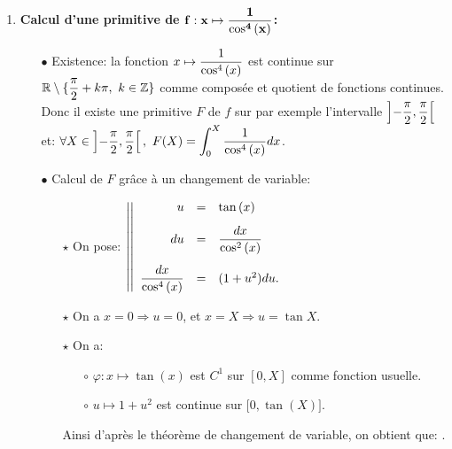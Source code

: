 \documentclass[a4paper, 11pt,reqno]{article}
\begin{document}
\begin{correction}
\begin{enumerate}
		\item \textbf{Calcul d'une primitive de $\mathbf{f: x\mapsto \displaystyle\frac{1}{\cos^4{(x)}}}$:}
		      \begin{itemize}
			      \item[$\bullet$] Existence: la fonction $x\mapsto     \displaystyle\frac{1}{\cos^4{(x)}}$ est continue sur
			            $\mathbb{R}\setminus\lbrace \displaystyle\frac{\pi}{2}+k\pi,\ k\in\mathbb{Z}\rbrace$ comme compos\'ee et quotient de fonctions continues. Donc il existe une primitive $F$ de $f$ sur par exemple l'intervalle $\left\rbrack -\displaystyle\frac{\pi}{2},\displaystyle\frac{\pi}{2}\right\lbrack$ et: $\forall X\in\left\rbrack -\displaystyle\frac{\pi}{2},\displaystyle\frac{\pi}{2}\right\lbrack,\  \displaystyle F(X)=\int_0^X  \displaystyle\frac{1}{\cos^4{(x)}}dx$.
			      \item[$\bullet$] Calcul de $F$ gr\^{a}ce \`{a} un changement de variable:
			            \begin{itemize}
				            \item[$\star$] On pose: $\left| \left|\begin{array}{rll}
						                  u                          & = & \tan{(x)}\vsec                   \\
						                  du                         & = & \ddp\frac{dx}{\cos^2{(x)}} \vsec \\
						                  \ddp\frac{dx}{\cos^4{(x)}} & = & (1+u^2)du.
					                  \end{array}\right.\right.$
				            \item[$\star$] On a $x=0 \Rightarrow u=0$, et $x=X \Rightarrow u= \tan{X}$.
				            \item[$\star$] On a:
				                  \begin{itemize}
					                  \item[$\circ$] $\varphi: x\mapsto \tan{(x)}$ est $C^1$ sur $\left\lbrack 0,X \right\rbrack$ comme fonction usuelle.
					                  \item[$\circ$] $u\mapsto 1+u^2 $ est continue sur $\lbrack 0,\tan{(X)}\rbrack$.
				                  \end{itemize}
				                  Ainsi d'apr\`{e}s le th\'eor\`{e}me de changement de variable, on obtient que:
				                  .
			            \end{itemize}
		      \end{itemize}

\end{enumerate}
\end{correction}
\end{document}
